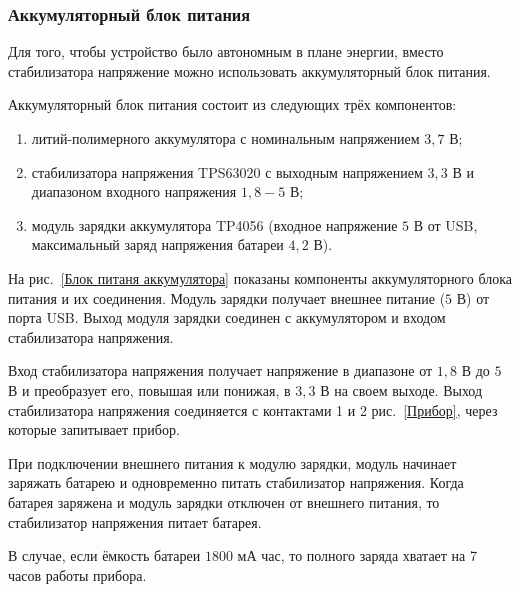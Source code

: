 \documentclass[12pt]{extarticle}
\begin{document}
\subsubsection{Аккумуляторный блок питания}\label{Аккумуляторный блок питания}

Для того, чтобы устройство было автономным в плане энергии, вместо стабилизатора напряжение можно использовать аккумуляторный блок питания.

Аккумуляторный блок питания состоит из следующих трёх компонентов:
\begin{enumerate}
    \item литий-полимерного аккумулятора с номинальным напряжением $3{,}7$ В;
    \item стабилизатора напряжения TPS63020 с выходным напряжением $3{,}3$ В и диапазоном входного напряжения $1{,}8-5$ В;
    \item модуль зарядки аккумулятора TP4056 (входное напряжение $5$ В от USB, максимальный заряд напряжения батареи $4{,}2$ В).
\end{enumerate}

\noindent%
\begin{minipage}{\linewidth}%
\vspace{0.5cm}
\centering

\label{Блок питаня аккумулятора}
\vspace{4mm}
\end{minipage}

На рис.~\ref{Блок питаня аккумулятора} показаны компоненты аккумуляторного блока питания и их соединения. Модуль зарядки получает внешнее питание ($5$ В) от порта USB. Выход модуля зарядки соединен с аккумулятором и входом стабилизатора напряжения.

Вход стабилизатора напряжения получает напряжение в диапазоне от $1{,}8$ В до $5$ В и преобразует его, повышая или понижая, в $3{,}3$ В на своем выходе. Выход стабилизатора напряжения соединяется с контактами 1 и 2 рис.~\ref{Прибор}, через которые запитывает прибор. 

При подключении внешнего питания к модулю зарядки, модуль начинает заряжать батарею и одновременно питать стабилизатор напряжения. Когда батарея заряжена и модуль зарядки отключен от внешнего питания, то стабилизатор напряжения питает батарея.

В случае, если ёмкость батареи $1800$ мА час, то полного заряда хватает на 7 часов работы прибора.
\end{document}
